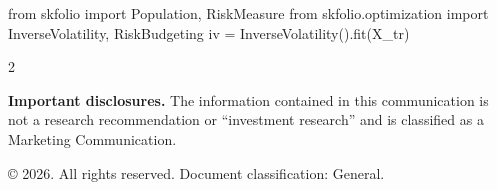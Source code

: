 \documentclass{pyportfolios-note}
\begin{document}

\begin{notecode}
from skfolio import Population, RiskMeasure
from skfolio.optimization import InverseVolatility, RiskBudgeting
iv = InverseVolatility().fit(X_tr)
\end{notecode}

\notedivider

\begin{multicols}{2}
\end{multicols}

\begin{disclosures}
\textbf{Important disclosures.} The information contained in this communication
is not a research recommendation or ``investment research'' and is classified as
a Marketing Communication.

© 2026. All rights reserved. Document classification: General.
\end{disclosures}
\end{document}
